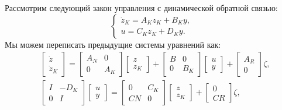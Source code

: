Рассмотрим следующий закон управления с динамической обратной связью:
\begin{equation}
	\label{eq:part5_controller}
	\begin{cases}
		\dot{{z}}_K = {A}_K {z}_K + {B}_K {y},\\
		{u} = {C}_K {z}_K + {D}_K {y}.
	\end{cases}
\end{equation}
Мы можем переписать предыдущие системы уравнений как:
\begin{align}
	\label{eq:part5_system1}
	&\begin{bmatrix}
		{\dot{z}} \\ {\dot{z}}_K
	\end{bmatrix}
	=
	\begin{bmatrix}
		{A}_N & 0 \\
		0 & {A}_K
	\end{bmatrix}
	\begin{bmatrix}
		{z} \\ {z}_K 
	\end{bmatrix}
	+
	\begin{bmatrix}
		{B} & 0 \\
		0 & {B}_K 
	\end{bmatrix}
	\begin{bmatrix}
		{u} \\ {y}
	\end{bmatrix}
	+
	\begin{bmatrix}
		{A}_R \\ 0 
	\end{bmatrix}
	\zeta,
	\\
	\label{eq:part5_system2}
	& \begin{bmatrix}
		{I} & -{D}_K \\
		0 & {I}
	\end{bmatrix}
	\begin{bmatrix}
		{u} \\ {y}
	\end{bmatrix}
	=
	\begin{bmatrix}
		0 & {C}_K \\
		{C} {N} & 0
	\end{bmatrix}
	\begin{bmatrix}
		{z} \\ {z}_K
	\end{bmatrix}
	+
	\begin{bmatrix}
		0 \\ {C} {R}
	\end{bmatrix}{\zeta},
\end{align}
